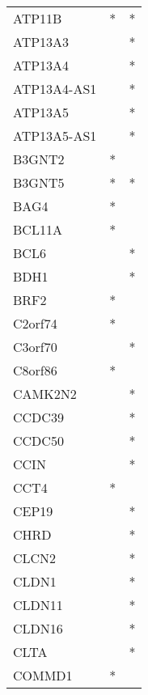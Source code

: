 \begin{longtable}{lcc}
ATP11B           &              * &          * \\
ATP13A3          &                &          * \\
ATP13A4          &                &          * \\
ATP13A4-AS1      &                &          * \\
ATP13A5          &                &          * \\
ATP13A5-AS1      &                &          * \\
B3GNT2           &              * &            \\
B3GNT5           &              * &          * \\
BAG4             &              * &            \\
BCL11A           &              * &            \\
BCL6             &                &          * \\
BDH1             &                &          * \\
BRF2             &              * &            \\
C2orf74          &              * &            \\
C3orf70          &                &          * \\
C8orf86          &              * &            \\
CAMK2N2          &                &          * \\
CCDC39           &                &          * \\
CCDC50           &                &          * \\
CCIN             &                &          * \\
CCT4             &              * &            \\
CEP19            &                &          * \\
CHRD             &                &          * \\
CLCN2            &                &          * \\
CLDN1            &                &          * \\
CLDN11           &                &          * \\
CLDN16           &                &          * \\
CLTA             &                &          * \\
COMMD1           &              * &            \\

\end{longtable}
